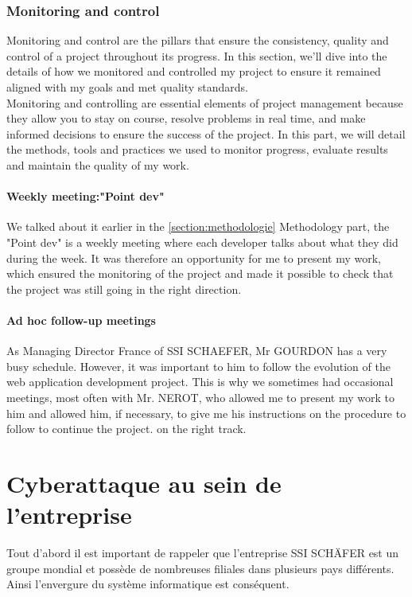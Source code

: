 \documentclass[a4paper, 12pt, french]{article}
\begin{document}
			\section{Monitoring and control}
				Monitoring and control are the pillars that ensure the consistency, quality and control of a project throughout its progress. In this section, we'll dive into the details of how we monitored and controlled my project to ensure it remained aligned with my goals and met quality standards.\\

				Monitoring and controlling are essential elements of project management because they allow you to stay on course, resolve problems in real time, and make informed decisions to ensure the success of the project. In this part, we will detail the methods, tools and practices we used to monitor progress, evaluate results and maintain the quality of my work.
				\newpage
				\subsection{Weekly meeting:"Point dev"}
					We talked about it earlier in the \ref{section:methodologie} Methodology part, the "Point dev" is a weekly meeting where each developer talks about what they did during the week. It was therefore an opportunity for me to present my work, which ensured the monitoring of the project and made it possible to check that the project was still going in the right direction.
					
				\subsection{Ad hoc follow-up meetings}
					As Managing Director France of SSI SCHAEFER, Mr GOURDON has a very busy schedule. However, it was important to him to follow the evolution of the web application development project. This is why we sometimes had occasional meetings, most often with Mr. NEROT, who allowed me to present my work to him and allowed him, if necessary, to give me his instructions on the procedure to follow to continue the project. on the right track.

		\newpage

		\part{Cyberattaque au sein de l'entreprise}
			Tout d'abord il est important de rappeler que l'entreprise SSI SCHÄFER est un groupe mondial et possède de nombreuses filiales dans plusieurs pays différents. Ainsi l'envergure du système informatique est conséquent.\\
				
\end{document}
